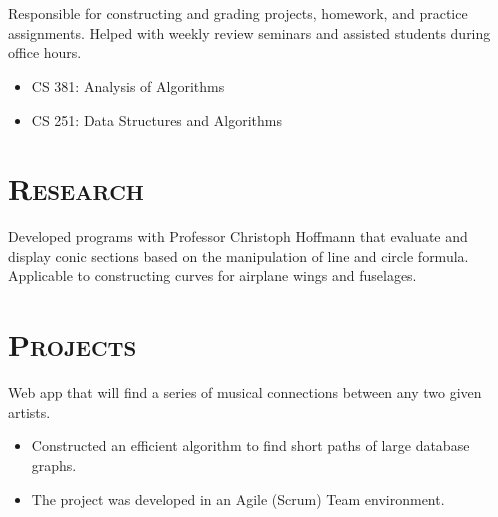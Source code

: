 \begin{resume}
  \begin{formatb}
    \\
    \body\\
  \end{formatb}

  \begin{position}
    Responsible for constructing and grading projects, homework, and practice assignments. Helped with weekly review seminars and assisted students during office hours.
    \begin{itemize}
      \setlength\itemsep{0em}
      \item CS 381: Analysis of Algorithms
      \item CS 251: Data Structures and Algorithms
    \end{itemize}
  \end{position}

  \section{\textsc{Research}}

  \begin{position}
    Developed programs with Professor Christoph Hoffmann that evaluate and display conic sections based on the manipulation of line and circle formula. Applicable to constructing curves for airplane wings and fuselages.
  \end{position}

  \section{\textsc{Projects}}

  \begin{position}
    Web app that will find a series of musical connections between any two given artists. 
    \begin{itemize}
      \setlength\itemsep{0em}
      \item Constructed an efficient algorithm to find short paths of large database graphs.
      \item The project was developed in an Agile (Scrum) Team environment.
    \end{itemize}
  \end{position}


\end{resume}
